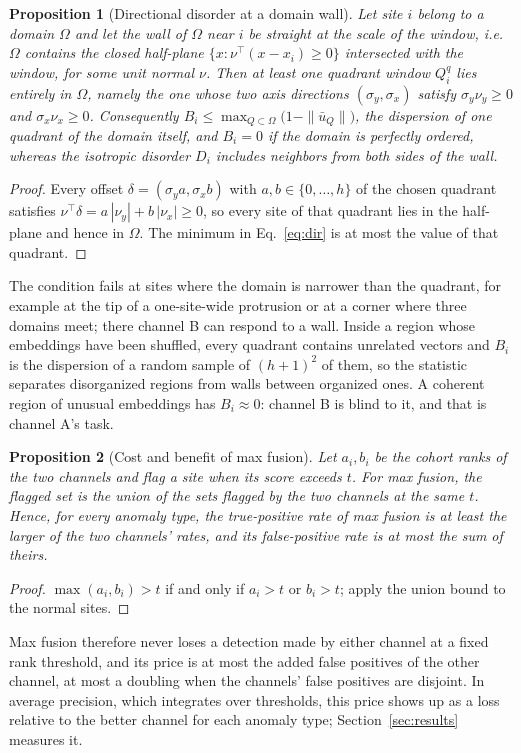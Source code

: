 \documentclass[preprint,review,12pt]{elsarticle}
\newtheorem{proposition}{Proposition}
\begin{document}
\begin{proposition}[Directional disorder at a domain wall]
\label{prop:wall}
Let site $i$ belong to a domain $\Omega$ and let the wall of $\Omega$ near $i$ be straight at the scale of the window, i.e.\ $\Omega$ contains the closed half-plane $\{x:\nu^{\top}(x-x_i)\ge0\}$ intersected with the window, for some unit normal $\nu$. Then at least one quadrant window $Q_i^q$ lies entirely in $\Omega$, namely the one whose two axis directions $(\sigma_y,\sigma_x)$ satisfy $\sigma_y\nu_y\ge0$ and $\sigma_x\nu_x\ge0$. Consequently $B_i\le\max_{Q\subset\Omega}\bigl(1-\|\bar u_Q\|\bigr)$, the dispersion of one quadrant of the domain itself, and $B_i=0$ if the domain is perfectly ordered, whereas the isotropic disorder $D_i$ includes neighbors from both sides of the wall.
\end{proposition}
\begin{proof}
Every offset $\delta=(\sigma_y a,\sigma_x b)$ with $a,b\in\{0,\dots,h\}$ of the chosen quadrant satisfies $\nu^{\top}\delta=a\,|\nu_y|+b\,|\nu_x|\ge0$, so every site of that quadrant lies in the half-plane and hence in $\Omega$. The minimum in Eq.~\eqref{eq:dir} is at most the value of that quadrant.
\end{proof}
The condition fails at sites where the domain is narrower than the quadrant, for example at the tip of a one-site-wide protrusion or at a corner where three domains meet; there channel B can respond to a wall. Inside a region whose embeddings have been shuffled, every quadrant contains unrelated vectors and $B_i$ is the dispersion of a random sample of $(h+1)^2$ of them, so the statistic separates disorganized regions from walls between organized ones. A coherent region of unusual embeddings has $B_i\approx0$: channel B is blind to it, and that is channel A's task.

\begin{proposition}[Cost and benefit of max fusion]
\label{prop:fuse}
Let $a_i,b_i$ be the cohort ranks of the two channels and flag a site when its score exceeds $t$. For max fusion, the flagged set is the union of the sets flagged by the two channels at the same $t$. Hence, for every anomaly type, the true-positive rate of max fusion is at least the larger of the two channels' rates, and its false-positive rate is at most the sum of theirs.
\end{proposition}
\begin{proof}
$\max(a_i,b_i)>t$ if and only if $a_i>t$ or $b_i>t$; apply the union bound to the normal sites.
\end{proof}
Max fusion therefore never loses a detection made by either channel at a fixed rank threshold, and its price is at most the added false positives of the other channel, at most a doubling when the channels' false positives are disjoint. In average precision, which integrates over thresholds, this price shows up as a loss relative to the better channel for each anomaly type; Section~\ref{sec:results} measures it.
\end{document}
